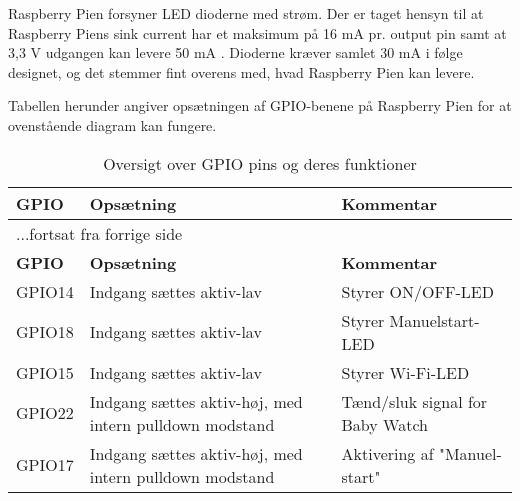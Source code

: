 
Raspberry Pien forsyner LED dioderne med strøm. Der er taget hensyn til at Raspberry Piens sink current har et maksimum på 16 mA pr. output pin samt at 3,3 V udgangen kan levere 50 mA \citep{website:raspi-power}. Dioderne kræver samlet 30 mA i følge designet, og det stemmer fint overens med, hvad Raspberry Pien kan levere. 

Tabellen herunder angiver opsætningen af GPIO-benene på Raspberry Pien for at ovenstående diagram kan fungere.

\begin{center}
\label{ctrl:raspberry_pi_setup}
\begin{longtable}{|p{3cm}|p{4cm}|p{4cm}|}
\caption{Oversigt over GPIO pins og deres funktioner}\\
\hline
\textbf{GPIO}	&\textbf{Opsætning} 		&\textbf{Kommentar} 	\\ \hline
\endfirsthead
\multicolumn{3}{l}{...fortsat fra forrige side} \\ \hline 
\textbf{GPIO}	&\textbf{Opsætning} 		&\textbf{Kommentar}  \\ \hline
\endhead



GPIO14
&Indgang sættes aktiv-lav
&Styrer ON/OFF-LED

\\\hline

GPIO18
&Indgang sættes aktiv-lav
&Styrer Manuelstart-LED

\\\hline


GPIO15
&Indgang sættes aktiv-lav
&Styrer Wi-Fi-LED

\\\hline

GPIO22
&Indgang sættes aktiv-høj, med intern pulldown modstand
&Tænd/sluk signal for Baby Watch

\\\hline

GPIO17
&Indgang sættes aktiv-høj, med intern pulldown modstand
&Aktivering af "Manuel-start"
\\\hline

\end{longtable}
\end{center}

